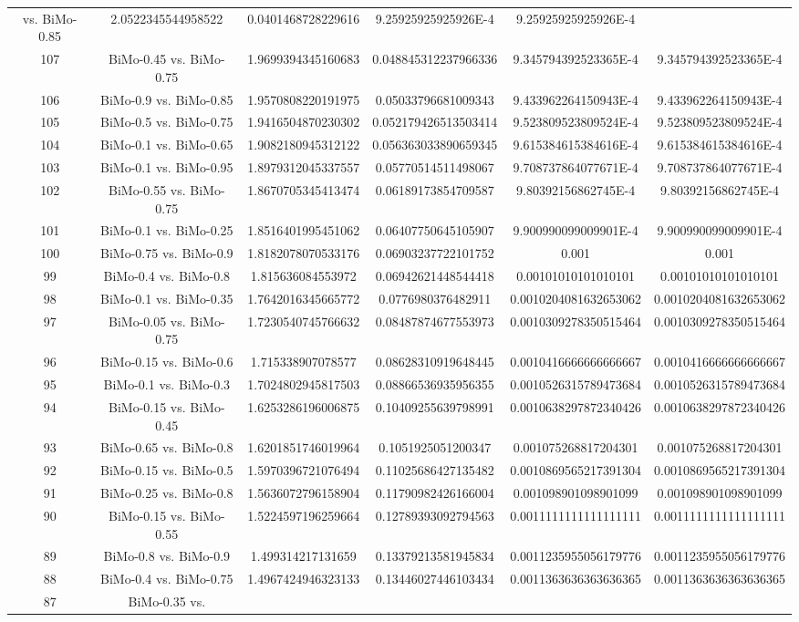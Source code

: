 \documentclass[a4paper,10pt]{article}
\begin{document}
\begin{landscape}
\begin{table}[!htp]
\begin{tabular}{cccccc}
vs. BiMo-0.85&2.0522345544958522&0.0401468728229616&9.25925925925926E-4&9.25925925925926E-4\\107&BiMo-0.45 vs. BiMo-0.75&1.9699394345160683&0.048845312237966336&9.345794392523365E-4&9.345794392523365E-4\\106&BiMo-0.9 vs. BiMo-0.85&1.9570808220191975&0.05033796681009343&9.433962264150943E-4&9.433962264150943E-4\\105&BiMo-0.5 vs. BiMo-0.75&1.9416504870230302&0.052179426513503414&9.523809523809524E-4&9.523809523809524E-4\\104&BiMo-0.1 vs. BiMo-0.65&1.9082180945312122&0.056363033890659345&9.615384615384616E-4&9.615384615384616E-4\\103&BiMo-0.1 vs. BiMo-0.95&1.8979312045337557&0.05770514511498067&9.708737864077671E-4&9.708737864077671E-4\\102&BiMo-0.55 vs. BiMo-0.75&1.8670705345413474&0.06189173854709587&9.80392156862745E-4&9.80392156862745E-4\\101&BiMo-0.1 vs. BiMo-0.25&1.8516401995451062&0.06407750645105907&9.900990099009901E-4&9.900990099009901E-4\\100&BiMo-0.75 vs. BiMo-0.9&1.8182078070533176&0.06903237722101752&0.001&0.001\\99&BiMo-0.4 vs. BiMo-0.8&1.815636084553972&0.06942621448544418&0.00101010101010101&0.00101010101010101\\98&BiMo-0.1 vs. BiMo-0.35&1.7642016345665772&0.0776980376482911&0.0010204081632653062&0.0010204081632653062\\97&BiMo-0.05 vs. BiMo-0.75&1.7230540745766632&0.08487874677553973&0.0010309278350515464&0.0010309278350515464\\96&BiMo-0.15 vs. BiMo-0.6&1.715338907078577&0.08628310919648445&0.0010416666666666667&0.0010416666666666667\\95&BiMo-0.1 vs. BiMo-0.3&1.7024802945817503&0.08866536935956355&0.0010526315789473684&0.0010526315789473684\\94&BiMo-0.15 vs. BiMo-0.45&1.6253286196006875&0.10409255639798991&0.0010638297872340426&0.0010638297872340426\\93&BiMo-0.65 vs. BiMo-0.8&1.6201851746019964&0.1051925051200347&0.001075268817204301&0.001075268817204301\\92&BiMo-0.15 vs. BiMo-0.5&1.5970396721076494&0.11025686427135482&0.0010869565217391304&0.0010869565217391304\\91&BiMo-0.25 vs. BiMo-0.8&1.5636072796158904&0.11790982426166004&0.001098901098901099&0.001098901098901099\\90&BiMo-0.15 vs. BiMo-0.55&1.5224597196259664&0.12789393092794563&0.0011111111111111111&0.0011111111111111111\\89&BiMo-0.8 vs. BiMo-0.9&1.499314217131659&0.13379213581945834&0.0011235955056179776&0.0011235955056179776\\88&BiMo-0.4 vs. BiMo-0.75&1.4967424946323133&0.13446027446103434&0.0011363636363636365&0.0011363636363636365\\87&BiMo-0.35 vs. 
\end{tabular}
\end{table}
\end{landscape}
\end{document}
